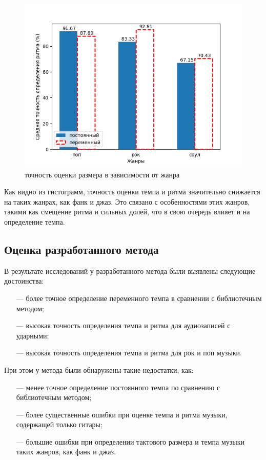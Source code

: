 \begin{figure}[h]
	\centering
	\includegraphics[scale=1]{../graphs/measure_genres.png}
	\caption{точность оценки размера в зависимости от жанра}
	\label{img:measure_genres}
\end{figure}

Как видно из гистограмм, точность оценки темпа и ритма значительно снижается на таких жанрах, как фанк и джаз. Это связано с особенностями этих жанров, такими как смещение ритма и сильных долей, что в свою очередь влияет и на определение темпа.

\subsection{Оценка разработанного метода}

В результате исследований у разработанного метода были выявлены следующие достоинства:

\begin{itemize}
	\item[---] более точное определение переменного темпа в сравнении с библиотечным методом;
	\item[---] высокая точность определения темпа и ритма для аудиозаписей с ударными;
	\item[---] высокая точность определения темпа и ритма для рок и поп музыки.
\end{itemize}

При этом у метода были обнаружены такие недостатки, как:

\begin{itemize}
	\item[---] менее точное определение постоянного темпа по сравнению с библиотечным методом;
	\item[---] более существенные ошибки при оценке темпа и ритма музыки, содержащей только гитары;
	\item[---] большие ошибки при определении тактового размера и темпа музыки таких жанров, как фанк и джаз.
\end{itemize}

